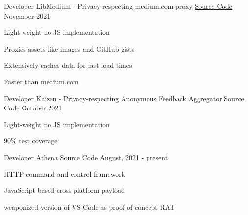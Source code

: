 
\begin{cventries}
  \cventry
	{Developer}
	{LibMedium - Privacy-respecting medium.com proxy}
	{\href{https://github.com/realaravinth/libmedium}{Source Code}}
	{November 2021}
	{
		\begin{cvitems}
			\item {Light-weight no JS implementation}
			\item {Proxies assets like images and GitHub gists}
			\item {Extensively caches data for fast load times}
			\item {Faster than medium.com}
		\end{cvitems}
	}

  \cventry
	{Developer}
	{Kaizen - Privacy-respecting Anonymous Feedback Aggregator}
	{\href{https://github.com/realaravinth/kaizen}{Source Code}}
	{October 2021}
	{
		\begin{cvitems}
			\item {Light-weight no JS implementation}
			\item {90\% test coverage}
		\end{cvitems}
	}

  \cventry
    {Developer} %
    {Athena} %
    {\href{https://github.com/realaravinth/athena}{Source Code}} %
    {August, 2021 - present} %
    {
      \begin{cvitems} %
        \item {HTTP command and control framework}
        \item {JavaScript based cross-platform payload}
        \item {weaponized version of VS Code as proof-of-concept RAT}
      \end{cvitems}
    }
  

\end{cventries}
